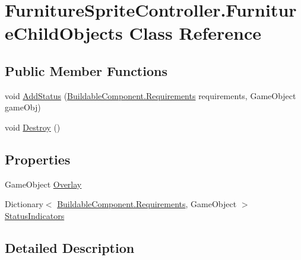 \hypertarget{class_furniture_sprite_controller_1_1_furniture_child_objects}{}\section{Furniture\+Sprite\+Controller.\+Furniture\+Child\+Objects Class Reference}
\label{class_furniture_sprite_controller_1_1_furniture_child_objects}
\subsection*{Public Member Functions}
\begin{DoxyCompactItemize}
\item 
void \hyperlink{class_furniture_sprite_controller_1_1_furniture_child_objects_aa0690cd9e06e27f998daae2ab034f6b4}{Add\+Status} (\hyperlink{class_project_porcupine_1_1_buildable_1_1_components_1_1_buildable_component_a331a0d67512b8b402c04c8cf31c0ca8a}{Buildable\+Component.\+Requirements} requirements, Game\+Object game\+Obj)
\item 
void \hyperlink{class_furniture_sprite_controller_1_1_furniture_child_objects_a5e536900a345afc49db683a0f87bbc0b}{Destroy} ()
\end{DoxyCompactItemize}
\subsection*{Properties}
\begin{DoxyCompactItemize}
\item 
Game\+Object \hyperlink{class_furniture_sprite_controller_1_1_furniture_child_objects_a0d56734a38a062719f146d12c97fd3c7}{Overlay}
\item 
Dictionary$<$ \hyperlink{class_project_porcupine_1_1_buildable_1_1_components_1_1_buildable_component_a331a0d67512b8b402c04c8cf31c0ca8a}{Buildable\+Component.\+Requirements}, Game\+Object $>$ \hyperlink{class_furniture_sprite_controller_1_1_furniture_child_objects_ad856ffc9d40cb9c2f03d5195c6c2e55b}{Status\+Indicators}
\end{DoxyCompactItemize}


\subsection{Detailed Description}


